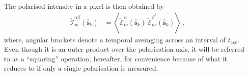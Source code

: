 \documentclass[
  journal=pasa,
  manuscript=article-type,
  year=2020,
  volume=37,
]{cup-journal}
\begin{document}
The polarised intensity in a pixel is then obtained by
\begin{align}
    \widetilde{\mathcal{I}}^{\alpha\beta}_m(\hat{\boldsymbol{s}}_k) &= \left\langle \widetilde{\mathcal{E}}_m^\alpha(\hat{\boldsymbol{s}}_k) \,  \widetilde{\mathcal{E}}_m^{\beta^*}(\hat{\boldsymbol{s}}_k) \right\rangle \, , \label{eqn:intra-station-opt-pol-img-outprod}
\end{align}
where, angular brackets denote a temporal averaging across an interval of $t_\textrm{acc}$. Even though it is an outer product over the polarisation axis, it will be referred to as a ``squaring'' operation, hereafter, for convenience because of what it reduces to if only a single polarisation is measured. 



\end{document}
